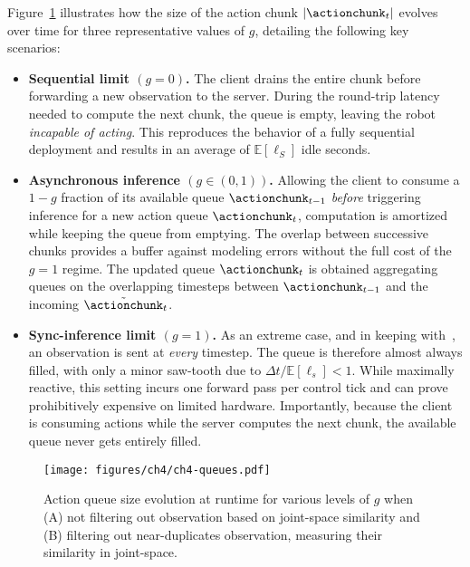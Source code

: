 Figure~\ref{fig:ch4-queues} illustrates how the size of the action chunk \(\lvert \actionchunk_t \rvert\) evolves over time for three representative values of \(g\), detailing the following key scenarios:
\begin{itemize}
    \item \textbf{Sequential limit \((g=0)\).} The client drains the entire chunk before forwarding a new observation to the server. During the round-trip latency needed to compute the next chunk, the queue is empty, leaving the robot \emph{incapable of acting}.  This reproduces the behavior of a fully sequential deployment and results in an average of \( \mathbb E[\ell_S] \) idle seconds.
    \item \textbf{Asynchronous inference \((g \in (0,1))\).} Allowing the client to consume a \(1-g\) fraction of its available queue \( \actionchunk_{t-1}\) \emph{before} triggering inference for a new action queue \( \actionchunk_{t} \), computation is amortized while keeping the queue from emptying. The overlap between successive chunks provides a buffer against modeling errors without the full cost of the \(g=1\) regime. The updated queue \( \actionchunk_t\) is obtained aggregating queues on the overlapping timesteps between \( \actionchunk_{t-1}\) and the incoming \(\tilde{\actionchunk}_{t}\).
    \item \textbf{Sync-inference limit \((g=1)\).}  As an extreme case, and in keeping with~\citet{zhaoLearningFineGrainedBimanual2023}, an observation is sent at \emph{every} timestep. The queue is therefore almost always filled, with only a minor saw-tooth due to \(\Delta t/\mathbb E[\ell_s] < 1\). While maximally reactive, this setting incurs one forward pass per control tick and can prove prohibitively expensive on limited hardware. Importantly, because the client is consuming actions while the server computes the next chunk, the available queue never gets entirely filled.
\end{itemize}

\begin{figure}
    \centering
    \begin{minipage}[t]{0.99\textwidth}
        \centering
        \texttt{[image: figures/ch4/ch4-queues.pdf]}
        \caption{Action queue size evolution at runtime for various levels of \( g\) when (A) not filtering out observation based on joint-space similarity and (B) filtering out near-duplicates observation, measuring their similarity in joint-space.}
        \label{fig:ch4-queues}
    \end{minipage}
\end{figure}

